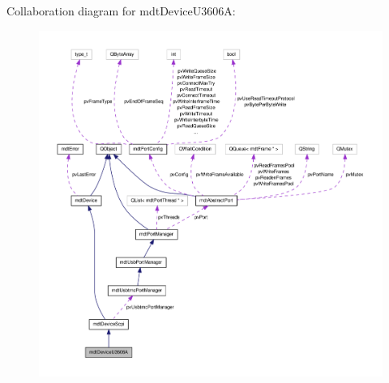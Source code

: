 Collaboration diagram for mdt\-Device\-U3606\-A\-:
\nopagebreak
\begin{figure}[H]
\begin{center}
\leavevmode
\includegraphics[width=350pt]{classmdt_device_u3606_a__coll__graph}
\end{center}
\end{figure}
